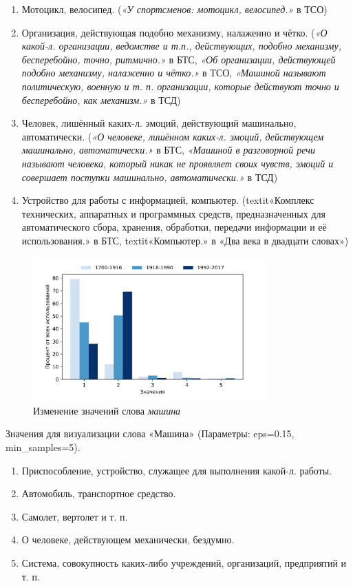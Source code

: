 \begin{enumerate}
    \item Мотоцикл, велосипед.
(\textit{«У спортсменов: мотоцикл, велосипед.»} в ТСО)

    \item Организация, действующая подобно механизму, налаженно и чётко.
(\textit{«О какой-л. организации, ведомстве и т.п., действующих, подобно механизму, бесперебойно, точно, ритмично.»} в БТС,
\textit{«Об организации, действующей подобно механизму, налаженно и чётко.»} в ТСО,
\textit{«Машиной называют политическую, военную и т. п. организации, которые действуют точно и бесперебойно, как механизм.»} в ТСД)

    \item Человек, лишённый каких-л. эмоций, действующий машинально, автоматически.
(\textit{«О человеке, лишённом каких-л. эмоций, действующем машинально, автоматически.»} в БТС,
\textit{«Машиной в разговорной речи называют человека, который никак не проявляет своих чувств, эмоций и совершает поступки машинально, автоматически.»} в ТСД)

    \item Устройство для работы с информацией, компьютер.
(textit{«Комплекс технических, аппаратных и программных средств, предназначенных для автоматического сбора, хранения, обработки, передачи информации и её использования.»} в БТС,
textit{«Компьютер.»} в «Два века в двадцати словах»)
\end{enumerate}

\begin{figure}[H]
	\centering
	\includegraphics[width=0.8\textwidth]{img/visualizations/mashina_minimal}
	\caption{Изменение значений слова \textit{машина}}
	\label{fig:Машина}
\end{figure}

Значения для визуализации слова «Машина» (Параметры: eps=0.15, min\_samples=5).

\begin{enumerate}
    \item Приспособление, устройство, служащее для выполнения какой-л. работы.
    \item Автомобиль, транспортное средство.
    \item Самолет, вертолет и т. п.
    \item О человеке, действующем механически, бездумно.
    \item Система, совокупность каких-либо учреждений, организаций, предприятий и т. п.
\end{enumerate}

